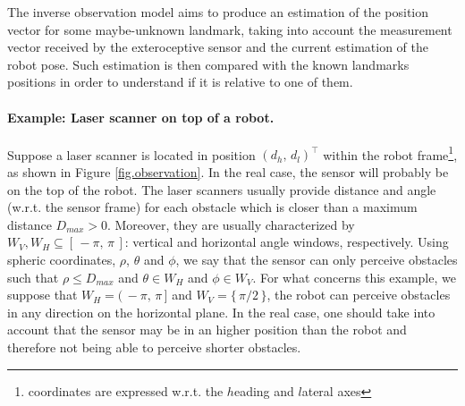 	The inverse observation model aims to produce an estimation of the position vector for some maybe-unknown landmark, taking into account the measurement vector received by the exteroceptive sensor and the current estimation of the robot pose.
	Such estimation is then compared with the known landmarks positions in order to understand if it is relative to one of them.
	
	\paragraph{Example: Laser scanner on top of a robot.}
		Suppose a laser scanner is located in position $(d_h,\,d_l)^\top$ within the robot frame\footnote{coordinates are expressed w.r.t. the $h$eading and $l$ateral axes}, as shown in Figure \ref{fig.observation}.
		In the real case, the sensor will probably be on the top of the robot.
		The laser scanners usually provide distance and angle (w.r.t. the sensor frame) for each obstacle which is closer than a maximum distance $D_{max} > 0$.
		Moreover, they are usually characterized by $W_{V},W_{H} \subseteq [\,-\pi,\, \pi\,]$: vertical and horizontal angle windows, respectively.
		Using spheric coordinates, $\rho$, $\theta$ and $\phi$, we say that the sensor can only perceive obstacles such that $\rho \leq D_{max}$ and $\theta \in W_{H}$ and $\phi \in W_{V}$.
		For what concerns this example, we suppose that $W_H = (\,-\pi,\, \pi\,]$ and $W_V = \{\, \pi / 2 \,\}$, \ie{} the robot can perceive obstacles in any direction on the horizontal plane.
		In the real case, one should take into account that the sensor may be in an higher position than the robot and therefore not being able to perceive shorter obstacles.
		
